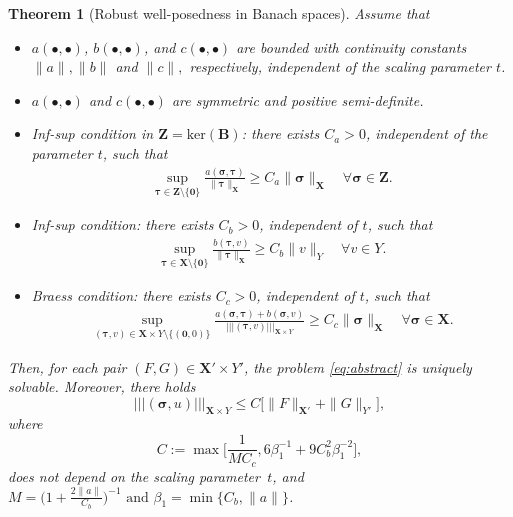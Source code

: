 \documentclass[11pt, reqno, a4paper, twoside]{article}
\newcommand*\tnorm[1]{|\!|\!| #1 |\!|\!|}
\newcommand\bsigma{\boldsymbol{\sigma}}
\newcommand\bzeta{\boldsymbol{\zeta}}
\newcommand\btau{\boldsymbol{\tau}}
\newcommand{\bB}{\mathbf{B}}
\newcommand{\bX}{\mathbf{X}}
\newcommand{\bZ}{\mathbf{Z}}
\newtheorem{theorem}{Theorem}[section]
\numberwithin{equation}{section}
\numberwithin{remark}{section}
\numberwithin{figure}{section}
\numberwithin{table}{section}
\begin{document}
\begin{theorem}[Robust well-posedness in Banach spaces]\label{th:abstract}
 Assume that  
\begin{itemize}
\item $a(\bullet,\bullet)$, $b(\bullet,\bullet)$, and $c(\bullet,\bullet)$  are bounded with {continuity constants} \(\|a\|, \|b\|\) and \(\|c\|,\) respectively, independent of the scaling parameter $t$. 
    \item $a(\bullet,\bullet)$ and $c(\bullet,\bullet)$ are symmetric and positive semi-definite.
    \item Inf-sup condition in $\bZ = \mathrm{ker}(\bB)$: there exists $C_a>0$, independent of the parameter $t$, such that 
    \begin{align}\label{eq:inf-sup.a} \sup_{\btau \in \bZ\setminus\{\boldsymbol{0}\}} \frac{a(\bsigma,\btau)}{\|\btau\|_{\bX}} \geq C_a \| \bsigma\|_{\bX} \quad \forall \bsigma \in \bZ.\end{align}
    \item Inf-sup condition: there exists $C_b>0$, independent of $t$, such that 
    \begin{align}\label{eq:inf-sup.b} \sup_{\btau \in \bX\setminus\{\boldsymbol{0}\}} \frac{b(\btau,v)}{\|\btau\|_{\bX}} \geq C_b \| v\|_Y \quad \forall v \in Y.\end{align}    
    \item Braess condition: there exists $C_c>0$, independent of $t$, such that 
    \begin{align}\label{eq:Braess}\sup_{(\btau,v) \in \bX\times Y \setminus\{(\boldsymbol{0},0)\}} \frac{a(\bsigma,\btau)+b(\bsigma,v)}{\tnorm{(\btau,v)}_{\bX\times Y}} \geq C_c \| \bsigma \|_{\bX} \quad \forall \bsigma \in \bX.\end{align} 
\end{itemize}
Then, for each pair $(F,G) \in \bX'\times Y'$, the problem \eqref{eq:abstract} is uniquely solvable. Moreover, there holds 
\[\tnorm{(\bsigma,u)}_{\bX\times Y} \leq C\bigl[ \|F\|_{\bX'} + \|G\|_{Y'}\bigr], \]
where \[C:=\max\bigl[\frac{1}{MC_c},6\beta_1^{-1}+9C_b^2\beta_1^{-2}\bigr],\]  
 does not depend on the scaling parameter \(\,t\), and \(M={\bigl({1+\frac{2\|a\|}{C_b}}\bigr)^{-1}} \text{ and } \beta_1=\min\{{C_b,\|a\|}\}\). 
\end{theorem}
\end{document}
